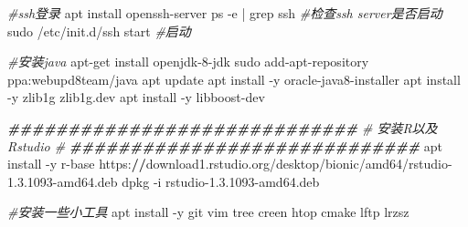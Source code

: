 \documentclass[
  10pt,
]{book}
\newenvironment{Shaded}{\begin{snugshade}}{\end{snugshade}}
\newcommand{\CommentTok}[1]{\textcolor[rgb]{0.56,0.35,0.01}{\textit{#1}}}
\newcommand{\DecValTok}[1]{\textcolor[rgb]{0.00,0.00,0.81}{#1}}
\newcommand{\DocumentationTok}[1]{\textcolor[rgb]{0.56,0.35,0.01}{\textbf{\textit{#1}}}}
\newcommand{\ErrorTok}[1]{\textcolor[rgb]{0.64,0.00,0.00}{\textbf{#1}}}
\newcommand{\FloatTok}[1]{\textcolor[rgb]{0.00,0.00,0.81}{#1}}
\newcommand{\NormalTok}[1]{#1}
\newcommand{\SpecialCharTok}[1]{\textcolor[rgb]{0.00,0.00,0.00}{#1}}
\begin{document}
\begin{Shaded}
\begin{Highlighting}[]
\CommentTok{\#ssh登录}
\NormalTok{apt install openssh}\SpecialCharTok{{-}}\NormalTok{server}
\NormalTok{ps }\SpecialCharTok{{-}}\NormalTok{e }\SpecialCharTok{|}\NormalTok{  grep ssh   }\CommentTok{\#检查ssh server是否启动}
\NormalTok{sudo }\SpecialCharTok{/}\NormalTok{etc}\SpecialCharTok{/}\NormalTok{init.d}\SpecialCharTok{/}\NormalTok{ssh start  }\CommentTok{\#启动}

\CommentTok{\#安装java}
\NormalTok{apt}\SpecialCharTok{{-}}\NormalTok{get install openjdk}\DecValTok{{-}8}\SpecialCharTok{{-}}\NormalTok{jdk}
\NormalTok{sudo add}\SpecialCharTok{{-}}\NormalTok{apt}\SpecialCharTok{{-}}\NormalTok{repository ppa}\SpecialCharTok{:}\NormalTok{webupd8team}\SpecialCharTok{/}\NormalTok{java}
\NormalTok{apt update}
\NormalTok{apt install }\SpecialCharTok{{-}}\NormalTok{y oracle}\SpecialCharTok{{-}}\NormalTok{java8}\SpecialCharTok{{-}}\NormalTok{installer}
\NormalTok{apt install }\SpecialCharTok{{-}}\NormalTok{y zlib1g zlib1g.dev}
\NormalTok{apt install }\SpecialCharTok{{-}}\NormalTok{y libboost}\SpecialCharTok{{-}}\NormalTok{dev}

\DocumentationTok{\#\#\#\#\#\#\#\#\#\#\#\#\#\#\#\#\#\#\#\#\#\#\#\#\#\#\#\#\#}
\CommentTok{\#        安装R以及Rstudio    \#}
\DocumentationTok{\#\#\#\#\#\#\#\#\#\#\#\#\#\#\#\#\#\#\#\#\#\#\#\#\#\#\#\#\#}
\NormalTok{apt install }\SpecialCharTok{{-}}\NormalTok{y r}\SpecialCharTok{{-}}\NormalTok{base}
\NormalTok{https}\SpecialCharTok{:}\ErrorTok{//}\NormalTok{download1.rstudio.org}\SpecialCharTok{/}\NormalTok{desktop}\SpecialCharTok{/}\NormalTok{bionic}\SpecialCharTok{/}\NormalTok{amd64}\SpecialCharTok{/}\NormalTok{rstudio}\DecValTok{{-}1}\NormalTok{.}\FloatTok{3.1093}\SpecialCharTok{{-}}\NormalTok{amd64.deb}
\NormalTok{dpkg }\SpecialCharTok{{-}}\NormalTok{i rstudio}\DecValTok{{-}1}\NormalTok{.}\FloatTok{3.1093}\SpecialCharTok{{-}}\NormalTok{amd64.deb}

\CommentTok{\#安装一些小工具}
\NormalTok{apt install }\SpecialCharTok{{-}}\NormalTok{y git vim tree creen htop cmake lftp lrzsz}


\end{Highlighting}
\end{Shaded}
\end{document}
